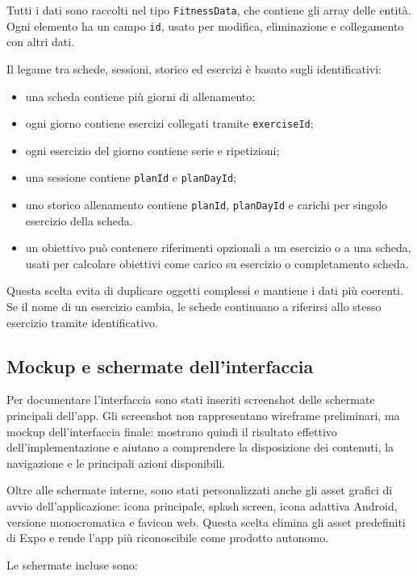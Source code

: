 \documentclass[11pt,a4paper]{article}
\begin{document}
Tutti i dati sono raccolti nel tipo \texttt{FitnessData}, che contiene gli array delle entità. Ogni elemento ha un campo \texttt{id}, usato per modifica, eliminazione e collegamento con altri dati.

Il legame tra schede, sessioni, storico ed esercizi è basato sugli identificativi:

\begin{itemize}
  \item una scheda contiene più giorni di allenamento;
  \item ogni giorno contiene esercizi collegati tramite \texttt{exerciseId};
  \item ogni esercizio del giorno contiene serie e ripetizioni;
  \item una sessione contiene \texttt{planId} e \texttt{planDayId};
  \item uno storico allenamento contiene \texttt{planId}, \texttt{planDayId} e carichi per singolo esercizio della scheda.
  \item un obiettivo può contenere riferimenti opzionali a un esercizio o a una scheda, usati per calcolare obiettivi come carico su esercizio o completamento scheda.
\end{itemize}

Questa scelta evita di duplicare oggetti complessi e mantiene i dati più coerenti. Se il nome di un esercizio cambia, le schede continuano a riferirsi allo stesso esercizio tramite identificativo.

\newpage
\subsection{Mockup e schermate dell'interfaccia}

Per documentare l'interfaccia sono stati inseriti screenshot delle schermate principali dell'app. Gli screenshot non rappresentano wireframe preliminari, ma mockup dell'interfaccia finale: mostrano quindi il risultato effettivo dell'implementazione e aiutano a comprendere la disposizione dei contenuti, la navigazione e le principali azioni disponibili.

Oltre alle schermate interne, sono stati personalizzati anche gli asset grafici di avvio dell'applicazione: icona principale, splash screen, icona adattiva Android, versione monocromatica e favicon web. Questa scelta elimina gli asset predefiniti di Expo e rende l'app più riconoscibile come prodotto autonomo.

Le schermate incluse sono:
\end{document}
